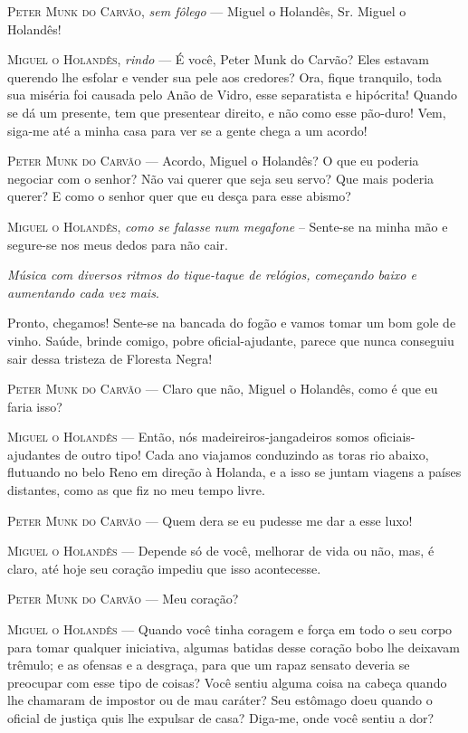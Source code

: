 \textsc{Peter Munk do Carvão}, \emph{sem fôlego} --- Miguel o Holandês, Sr. Miguel
o Holandês!

\textsc{Miguel o Holandês}, \emph{rindo} --- É você, Peter Munk do Carvão? Eles
estavam querendo lhe esfolar e vender sua pele aos credores? Ora, fique
tranquilo, toda sua miséria foi causada pelo Anão de Vidro, esse
separatista e hipócrita! Quando se dá um presente, tem que presentear
direito, e não como esse pão-duro! Vem, siga-me até a minha casa para
ver se a gente chega a um acordo!

\textsc{Peter Munk do Carvão} --- Acordo, Miguel o Holandês? O que eu poderia
negociar com o senhor? Não vai querer que seja seu servo? Que mais
poderia querer? E como o senhor quer que eu desça para esse abismo?

\textsc{Miguel o Holandês}, \emph{como se falasse num megafone} -- Sente-se na
minha mão e segure-se nos meus dedos para não cair.

\emph{Música com diversos ritmos do tique-taque de relógios, começando
baixo e aumentando cada vez mais}.

Pronto, chegamos! Sente-se na bancada do fogão e vamos tomar um bom gole
de vinho. Saúde, brinde comigo, pobre oficial-ajudante, parece que nunca
conseguiu sair dessa tristeza de Floresta Negra!

\textsc{Peter Munk do Carvão} --- Claro que não, Miguel o Holandês, como é que eu
faria isso?

\textsc{Miguel o Holandês} --- Então, nós madeireiros-jangadeiros somos
oficiais-ajudantes de outro tipo! Cada ano viajamos conduzindo as toras
rio abaixo, flutuando no belo Reno em direção à Holanda, e a isso se
juntam viagens a países distantes, como as que fiz no meu tempo livre.

\textsc{Peter Munk do Carvão} --- Quem dera se eu pudesse me dar a esse luxo!

\textsc{Miguel o Holandês} --- Depende só de você, melhorar de vida ou não, mas, é
claro, até hoje seu coração impediu que isso acontecesse.

\textsc{Peter Munk do Carvão} --- Meu coração?

\textsc{Miguel o Holandês} --- Quando você tinha coragem e força em todo o seu
corpo para tomar qualquer iniciativa, algumas batidas desse coração bobo
lhe deixavam trêmulo; e as ofensas e a desgraça, para que um rapaz
sensato deveria se preocupar com esse tipo de coisas? Você sentiu alguma
coisa na cabeça quando lhe chamaram de impostor ou de mau caráter? Seu
estômago doeu quando o oficial de justiça quis lhe expulsar de casa?
Diga-me, onde você sentiu a dor?

